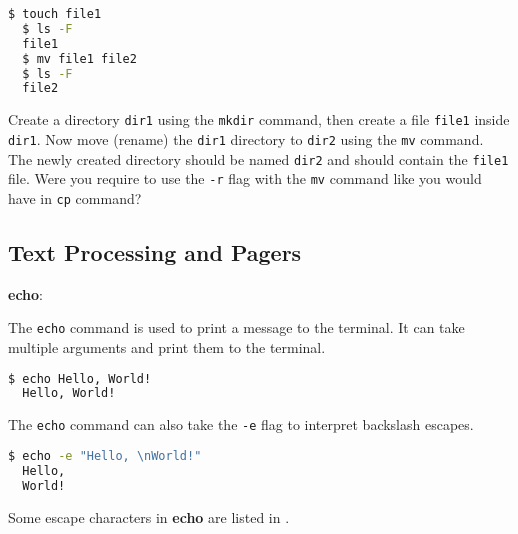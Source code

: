 \begin{lstlisting}[language=bash]
  $ touch file1
  $ ls -F
  file1
  $ mv file1 file2
  $ ls -F
  file2
\end{lstlisting}

\begin{exercise}
  Create a directory \texttt{dir1} using the \texttt{mkdir} command, then create a file \texttt{file1} inside \texttt{dir1}.
  Now move (rename) the \texttt{dir1} directory to \texttt{dir2} using the \texttt{mv} command.
  The newly created directory should be named \texttt{dir2} and should contain the \texttt{file1} file.
  Were you require to use the \texttt{-r} flag with the \texttt{mv} command like you would have in \texttt{cp} command?
\end{exercise}

\subsection{Text Processing and Pagers}

\textbf{echo}:

The \texttt{echo} command is used to print a message to the terminal.
It can take multiple arguments and print them to the terminal.

\begin{lstlisting}[language=bash]
  $ echo Hello, World!
  Hello, World!
\end{lstlisting}

The \texttt{echo} command can also take the \texttt{-e} flag to interpret backslash escapes.

\begin{lstlisting}[language=bash]
  $ echo -e "Hello, \nWorld!"
  Hello,
  World!
\end{lstlisting}

Some escape characters in \textbf{echo} are listed in .

